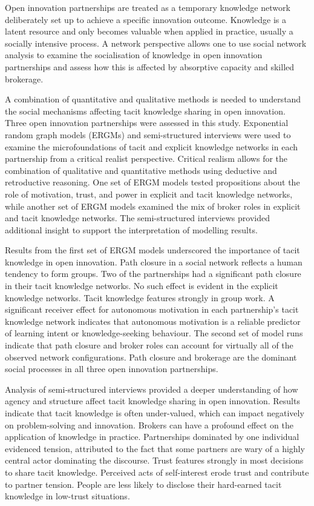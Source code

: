 \documentclass[12pt,table]{book}
\begin{document}
\noindent
Open innovation partnerships are treated as a temporary knowledge network deliberately set up to achieve a specific innovation outcome. Knowledge is a latent resource and only becomes valuable when applied in practice, usually a socially intensive process. A network perspective allows one to use social network analysis to examine the socialisation of knowledge in open innovation partnerships and assess how this is affected by absorptive capacity and skilled brokerage. \medskip

\noindent 
A combination of quantitative and qualitative methods is needed to understand the social mechanisms affecting tacit knowledge sharing in open innovation. Three open innovation partnerships were assessed in this study. Exponential random graph models (ERGMs) and semi-structured interviews were used to examine the microfoundations of tacit and explicit knowledge networks in each partnership from a critical realist perspective. Critical realism allows for the combination of qualitative and quantitative methods using deductive and retroductive reasoning. One set of ERGM models tested propositions about the role of motivation, trust, and power in explicit and tacit knowledge networks, while another set of ERGM models examined the mix of broker roles in explicit and tacit knowledge networks. The semi-structured interviews provided additional insight to support the interpretation of modelling results. \medskip

\noindent 
Results from the first set of ERGM models underscored the importance of tacit knowledge in open innovation. Path closure in a social network reflects a human tendency to form groups. Two of the partnerships had a significant path closure in their tacit knowledge networks. No such effect is evident in the explicit knowledge networks. Tacit knowledge features strongly in group work. A significant receiver effect for autonomous motivation in each partnership's tacit knowledge network indicates that autonomous motivation is a reliable predictor of learning intent or knowledge-seeking behaviour. The second set of model runs indicate that path closure and broker roles can account for virtually all of the observed network configurations. Path closure and brokerage are the dominant social processes in all three open innovation partnerships. \medskip

\noindent 
Analysis of semi-structured interviews provided a deeper understanding of how agency and structure affect tacit knowledge sharing in open innovation. Results indicate that tacit knowledge is often under-valued, which can impact negatively on problem-solving and innovation. Brokers can have a profound effect on the application of knowledge in practice. Partnerships dominated by one individual evidenced tension, attributed to the fact that some partners are wary of a highly central actor dominating the discourse. Trust features strongly in most decisions to share tacit knowledge. Perceived acts of self-interest erode trust and contribute to partner tension. People are less likely to disclose their hard-earned tacit knowledge in low-trust situations. \medskip
\end{document}
